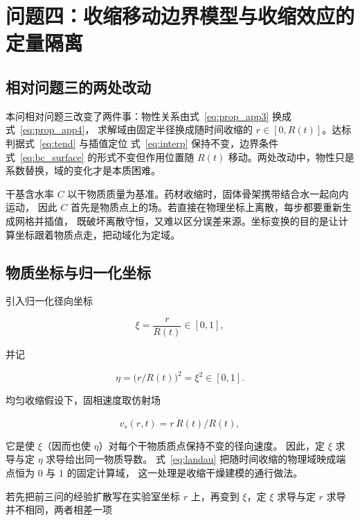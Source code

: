 \section{问题四：收缩移动边界模型与收缩效应的定量隔离}

\subsection{相对问题三的两处改动}

本问相对问题三改变了两件事：物性关系由式~\eqref{eq:prop_app3} 换成式~\eqref{eq:prop_app4}，
求解域由固定半径换成随时间收缩的 $r\in[0,R(t)]$。达标判据式~\eqref{eq:tend} 与插值定位
式~\eqref{eq:interp} 保持不变，边界条件式~\eqref{eq:bc_surface} 的形式不变但作用位置随
$R(t)$ 移动。两处改动中，物性只是系数替换，域的变化才是本质困难。

干基含水率 $C$ 以干物质质量为基准。药材收缩时，固体骨架携带结合水一起向内运动，
因此 $C$ 首先是物质点上的场。若直接在物理坐标上离散，每步都要重新生成网格并插值，
既破坏离散守恒，又难以区分误差来源。坐标变换的目的是让计算坐标跟着物质点走，把动域化为定域。

\subsection{物质坐标与归一化坐标}

引入归一化径向坐标

\begin{equation}\label{eq:landau}
\xi=\frac{r}{R(t)}\in[0,1],
\end{equation}

并记

\begin{equation}\label{eq:eta}
\eta=\bigl(r/R(t)\bigr)^2=\xi^2\in[0,1].
\end{equation}

均匀收缩假设下，固相速度取仿射场

\begin{equation}\label{eq:vs}
v_s(r,t)=r\,\dot R(t)/R(t),
\end{equation}

它是使 $\xi$（因而也使 $\eta$）对每个干物质质点保持不变的径向速度。
因此，定 $\xi$ 求导与定 $\eta$ 求导给出同一物质导数。
式~\eqref{eq:landau} 把随时间收缩的物理域映成端点恒为 $0$ 与 $1$ 的固定计算域，
这一处理是收缩干燥建模的通行做法。

若先把前三问的经验扩散写在实验室坐标 $r$ 上，再变到 $\xi$，定 $\xi$ 求导与定 $r$ 求导并不相同，两者相差一项

